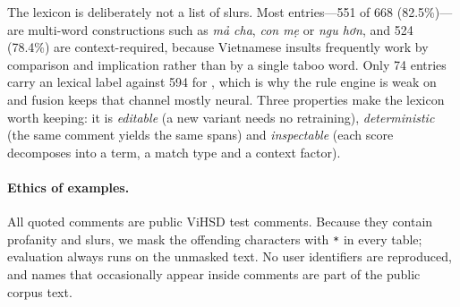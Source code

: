 The lexicon is deliberately not a list of slurs. Most entries---551 of 668
(82.5\%)---are multi-word constructions such as \emph{mả cha}, \emph{con mẹ} or
\emph{ngu hơn}, and 524 (78.4\%) are context-required, because Vietnamese insults
frequently work by comparison and implication rather than by a single taboo word.
Only 74 entries carry an \off{} lexical label against 594 for \hate{}, which is why the
rule engine is weak on \off{} and fusion keeps that channel mostly neural. Three
properties make the lexicon worth keeping: it is \emph{editable} (a new variant needs
no retraining), \emph{deterministic} (the same comment yields the same spans) and
\emph{inspectable} (each score decomposes into a term, a match type and a context
factor).

\paragraph{Ethics of examples.}
All quoted comments are public ViHSD test comments. Because they contain profanity
and slurs, we mask the offending characters with \texttt{*} in every table;
evaluation always runs on the unmasked text. No user identifiers are reproduced, and
names that occasionally appear inside comments are part of the public corpus text.

